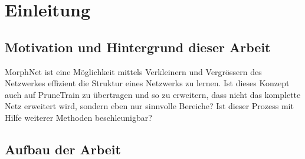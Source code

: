\chapter{Einleitung}
\label{sec:EinleitungGesamt}

\section{Motivation und Hintergrund dieser Arbeit}


MorphNet ist eine Möglichkeit mittels Verkleinern und Vergrössern des Netzwerkes effizient die Struktur eines Netzwerks zu lernen. Ist dieses Konzept auch auf PruneTrain zu übertragen und so zu erweitern, dass nicht das komplette Netz erweitert wird, sondern eben nur sinnvolle Bereiche?
Ist dieser Prozess mit Hilfe weiterer Methoden beschleunigbar?


\section{Aufbau der Arbeit}

